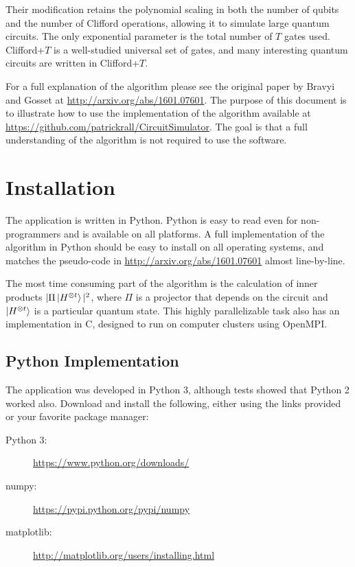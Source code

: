 \documentclass[11pt]{article}
\begin{document}
Their modification retains the polynomial scaling in both the number of qubits and the number of Clifford operations, allowing it to simulate large quantum circuits. The only exponential parameter is the total number of $T$ gates used. Clifford+$T$ is a well-studied universal set of gates, and many interesting quantum circuits are written in Clifford+$T$.

For a full explanation of the algorithm please see the original paper by Bravyi and Gosset at \url{http://arxiv.org/abs/1601.07601}. The purpose of this document is to illustrate how to use the implementation of the algorithm available at \url{https://github.com/patrickrall/CircuitSimulator}. The goal is that a full understanding of the algorithm is not required to use the software.

\clearpage
\tableofcontents

\clearpage
\section{Installation}

The application is written in Python. Python is easy to read even for non-programmers and is available on all platforms. A full implementation of the algorithm in Python should be easy to install on all operating systems, and matches the pseudo-code in \url{http://arxiv.org/abs/1601.07601} almost line-by-line.

The most time consuming part of the algorithm is the calculation of inner products $|\Pi\ket{H^{\otimes t}}|^2$, where $\Pi$ is a projector that depends on the circuit and $\ket{H^{\otimes t}}$ is a particular quantum state. This highly parallelizable task also has an implementation in C, designed to run on computer clusters using OpenMPI.

\subsection{Python Implementation}

The application was developed in Python 3, although tests showed that Python 2 worked also. Download and install the following, either using the links provided or your favorite package manager:

\begin{description}
    \item[Python 3:] \url{https://www.python.org/downloads/}
    \item[numpy:] \url{https://pypi.python.org/pypi/numpy}
    \item[matplotlib:] \url{http://matplotlib.org/users/installing.html}
\end{description}
\end{document}
